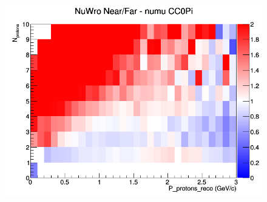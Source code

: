 \begin{figure}[h]
\endminipage
{}
\includegraphics[width=\linewidth]{eff_N_P/GAr/protons/ratios/CC0Pi_NuWro_numu_NF_N_P.png}
\endminipage
\newline
\end{figure}
\clearpage
